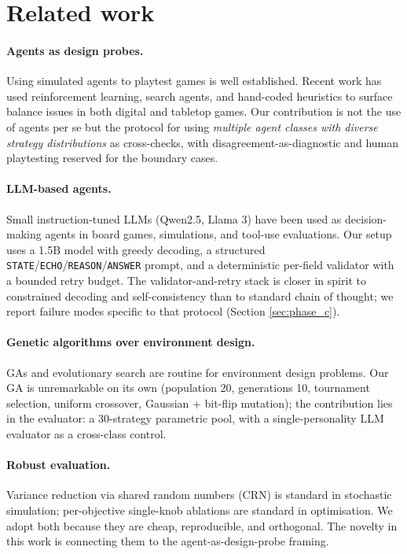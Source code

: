 \documentclass[10pt]{article}
\begin{document}
\section{Related work}\label{sec:related}

\paragraph{Agents as design probes.} Using simulated agents to playtest
games is well established. Recent work has used reinforcement learning,
search agents, and hand-coded heuristics to surface balance issues in
both digital and tabletop games. Our contribution is not the use of
agents per se but the protocol for using \emph{multiple agent classes
with diverse strategy distributions} as cross-checks, with
disagreement-as-diagnostic and human playtesting reserved for the
boundary cases.

\paragraph{LLM-based agents.} Small instruction-tuned LLMs (Qwen2.5,
Llama 3) have been used as decision-making agents in board games,
simulations, and tool-use evaluations. Our setup uses a 1.5B model with
greedy decoding, a structured \texttt{STATE}/\texttt{ECHO}/\texttt{REASON}/\texttt{ANSWER}
prompt, and a deterministic per-field validator with a bounded retry
budget. The validator-and-retry stack is closer in spirit to
constrained decoding and self-consistency than to standard chain of
thought; we report failure modes specific to that protocol (Section
\ref{sec:phase_c}).

\paragraph{Genetic algorithms over environment design.} GAs and
evolutionary search are routine for environment design problems. Our
GA is unremarkable on its own (population 20, generations 10,
tournament selection, uniform crossover, Gaussian + bit-flip
mutation); the contribution lies in the evaluator: a 30-strategy
parametric pool, with a single-personality LLM evaluator as a
cross-class control.

\paragraph{Robust evaluation.} Variance reduction via shared random
numbers (CRN) is standard in stochastic simulation; per-objective
single-knob ablations are standard in optimisation. We adopt both
because they are cheap, reproducible, and orthogonal. The novelty in
this work is connecting them to the agent-as-design-probe framing.
\end{document}
